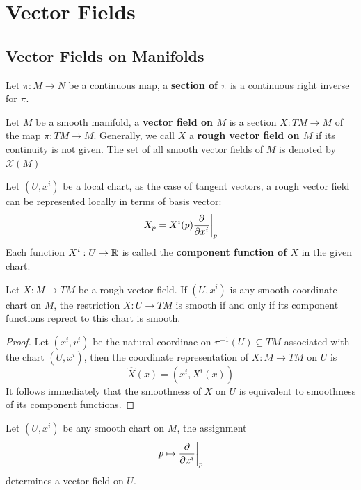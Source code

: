 \chapter{Vector Fields}

\section{Vector Fields on Manifolds}
\begin{definition}
   Let $\pi: M \to N$ be a continuous map, a \textbf{section of $\pi$} is a continuous right inverse for $\pi$.
\end{definition}
\begin{definition}
    Let $M$ be a smooth manifold, a \textbf{vector field on $M$} is a section $X: TM \to M$ of the map $\pi: TM \to M$. Generally, we call $X$ a \textbf{rough vector field on $M$} if its continuity is not given. The set of all smooth vector fields of $M$ is denoted by $\mathcal{X}(M)$
\end{definition}
Let $(U,x^i)$ be a local chart, as the case of tangent vectors, a rough vector field can be represented locally in terms of basis vector:
\[
    X_p = X^i(p) \frac{\partial}{\partial x^i}\bigg|_{p}
\]
Each function $X^i: U \to \mathbb{R}$ is called the \textbf{component function of $X$} in the given chart.
\begin{proposition}
    Let $X: M \to TM$ be a rough vector field. If $(U,x^i)$ is any smooth coordinate chart on $M$, the restriction $X: U \to TM$ is smooth if and only if its component functions reprect to this chart is smooth.
\end{proposition}
\begin{proof}
    Let $(x^i,v^i)$ be the natural coordinae on $\pi^{-1}(U) \subseteq TM$ associated with the chart $(U,x^i)$, then the coordinate representation of $X: M \to TM$ on $U$ is 
    \[
        \hat{X}(x) = (x^i,X^i(x))
    \]
    It follows immediately that the smoothness of $X$ on $U$ is equivalent to smoothness of its component functions.
\end{proof}
\begin{example} Let $(U,x^i)$ be any smooth chart on $M$, the assignment 
    \[
        p \mapsto \frac{\partial}{\partial x^i}\bigg|_p
    \]
    determines a vector field on $U$.
\end{example}

